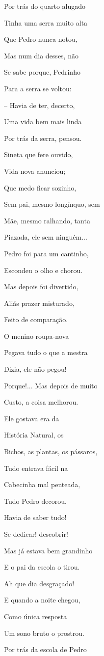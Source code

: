Por trás do quarto alugado

Tinha uma serra muito alta

Que Pedro nunca notou,

Mas num dia desses, não

Se sabe porque, Pedrinho

Para a serra se voltou:

-- Havia de ter, decerto,

Uma vida bem mais linda

Por trás da serra, pensou.

Sineta que fere ouvido,

Vida nova anunciou;

Que medo ficar sozinho,

Sem pai, mesmo longínquo, sem

Mãe, mesmo ralhando, tanta

Piazada, ele sem ninguém...

Pedro foi para um cantinho,

Escondeu o olho e chorou.

Mas depois foi divertido,

Aliás prazer misturado,

Feito de comparação.

O menino roupa-nova

Pegava tudo o que a mestra

Dizia, ele não pegou!

Porque!... Mas depois de muito

Custo, a coisa melhorou.

Ele gostava era da

História Natural, os

Bichos, as plantas, os pássaros,

Tudo entrava fácil na

Cabecinha mal penteada,

Tudo Pedro decorou.

Havia de saber tudo!

Se dedicar! descobrir!

Mas já estava bem grandinho

E o pai da escola o tirou.

Ah que dia desgraçado!

E quando a noite chegou,

Como única resposta

Um sono bruto o prostrou.

Por trás da escola de Pedro

